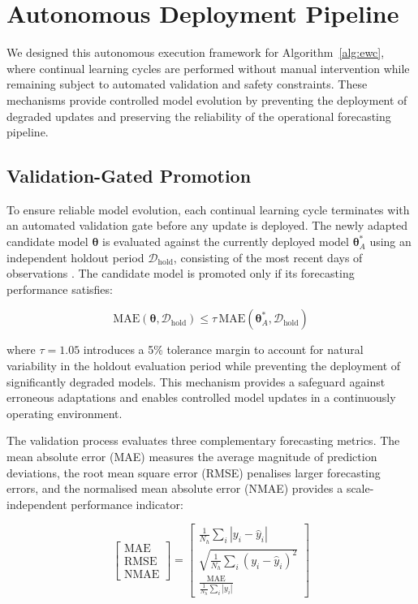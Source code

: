 \documentclass[journal]{IEEEtran}
\newcommand{\params}{\bm{\theta}}
\begin{document}
\section{Autonomous Deployment Pipeline}
\label{sec:deployment}

We designed this autonomous
execution framework for Algorithm~\ref{alg:ewc}, where continual learning
cycles are performed without manual intervention while remaining subject
to automated validation and safety constraints. These mechanisms provide
controlled model evolution by preventing the deployment of degraded
updates and preserving the reliability of the operational forecasting
pipeline.
\subsection{Validation-Gated Promotion}
\label{sec:validation_gate}

To ensure reliable model evolution, each continual learning cycle
terminates with an automated validation gate before any update is
deployed. The newly adapted candidate model $\params$ is evaluated
against the currently deployed model $\params_A^*$ using an independent
holdout period $\mathcal{D}_{\mathrm{hold}}$, consisting of the most
recent days of observations .
The candidate model is promoted only if its forecasting performance
satisfies:

\begin{equation}
    \mathrm{MAE}(\params,\mathcal{D}_{\mathrm{hold}})
    \leq
    \tau \,
    \mathrm{MAE}(\params_A^*,\mathcal{D}_{\mathrm{hold}})
    \label{eq:validation}
\end{equation}

where $\tau=1.05$ introduces a 5\% tolerance margin to account for
natural variability in the holdout evaluation period while preventing
the deployment of significantly degraded models. This mechanism
provides a safeguard against erroneous adaptations and enables controlled
model updates in a continuously operating environment.

The validation process evaluates three complementary forecasting
metrics. The mean absolute error (MAE) measures the average magnitude of
prediction deviations, the root mean square error (RMSE) penalises larger
forecasting errors, and the normalised mean absolute error (NMAE)
provides a scale-independent performance indicator:

\begin{equation}
\begin{bmatrix}
\mathrm{MAE} \\[2mm]
\mathrm{RMSE} \\[2mm]
\mathrm{NMAE}
\end{bmatrix}
=
\begin{bmatrix}
\frac{1}{N_h}\sum_i |y_i-\hat{y}_i|
\\[4mm]
\sqrt{\frac{1}{N_h}\sum_i (y_i-\hat{y}_i)^2}
\\[4mm]
\frac{\mathrm{MAE}}
{\frac{1}{N_h}\sum_i |y_i|}
\end{bmatrix}
\label{eq:forecast_metrics}
\end{equation}
\end{document}
